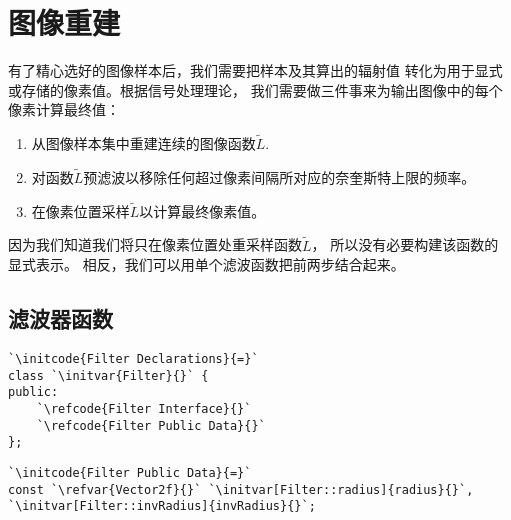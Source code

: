 \section{图像重建}\label{sec:图像重建}
有了精心选好的图像样本后，我们需要把样本及其算出的辐射值
转化为用于显式或存储的像素值。根据信号处理理论，
我们需要做三件事来为输出图像中的每个像素计算最终值：
\begin{enumerate}
    \item 从图像样本集中重建连续的图像函数$\tilde{L}$.
    \item 对函数$\tilde{L}$预滤波以移除任何超过像素间隔所对应的奈奎斯特上限的频率。
    \item 在像素位置采样$\tilde{L}$以计算最终像素值。
\end{enumerate}

因为我们知道我们将只在像素位置处重采样函数$\tilde{L}$，
所以没有必要构建该函数的显式表示。
相反，我们可以用单个滤波函数把前两步结合起来。

\subsection{滤波器函数}\label{sub:滤波器函数}

\begin{lstlisting}
`\initcode{Filter Declarations}{=}`
class `\initvar{Filter}{}` {
public:
    `\refcode{Filter Interface}{}`
    `\refcode{Filter Public Data}{}`
};
\end{lstlisting}

\begin{lstlisting}
`\initcode{Filter Public Data}{=}`
const `\refvar{Vector2f}{}` `\initvar[Filter::radius]{radius}{}`, `\initvar[Filter::invRadius]{invRadius}{}`;
\end{lstlisting}